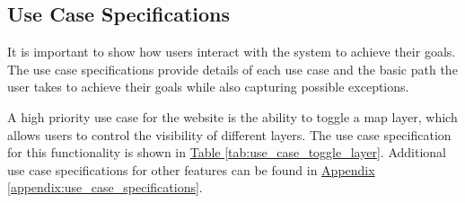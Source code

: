 \subsection{Use Case Specifications}

It is important to show how users interact with the system to achieve their goals. The use case specifications provide details of each use case and the basic path the user takes to achieve their goals while also capturing possible exceptions. 

A high priority use case for the website is the ability to toggle a map layer, which allows users to control the visibility of different layers. The use case specification for this functionality is shown in \hyperref[tab:use_case_toggle_layer]{Table \ref*{tab:use_case_toggle_layer}}. Additional use case specifications for other features can be found in \hyperref[appendix:use_case_specifications]{Appendix \ref*{appendix:use_case_specifications}}.

